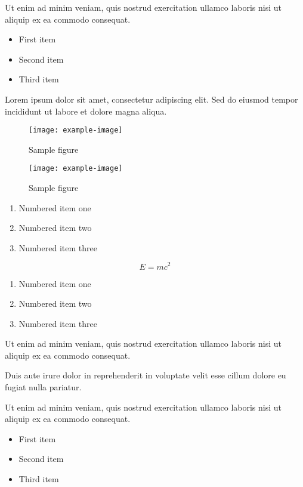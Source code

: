 \documentclass{article}
\begin{document}
Ut enim ad minim veniam, quis nostrud exercitation ullamco laboris nisi ut aliquip ex ea commodo consequat.

\begin{itemize}
\item First item
\item Second item
\item Third item
\end{itemize}

Lorem ipsum dolor sit amet, consectetur adipiscing elit. Sed do eiusmod tempor incididunt ut labore et dolore magna aliqua.

\begin{figure}[h]
    \centering
    \texttt{[image: example-image]}
    \caption{Sample figure}
    \label{fig:sample}
\end{figure}

\begin{figure}[h]
    \centering
    \texttt{[image: example-image]}
    \caption{Sample figure}
    \label{fig:sample}
\end{figure}

\begin{enumerate}
\item Numbered item one
\item Numbered item two
\item Numbered item three
\end{enumerate}

\begin{equation}
    E = mc^2
\end{equation}


\begin{enumerate}
\item Numbered item one
\item Numbered item two
\item Numbered item three
\end{enumerate}

Ut enim ad minim veniam, quis nostrud exercitation ullamco laboris nisi ut aliquip ex ea commodo consequat.

Duis aute irure dolor in reprehenderit in voluptate velit esse cillum dolore eu fugiat nulla pariatur.


Ut enim ad minim veniam, quis nostrud exercitation ullamco laboris nisi ut aliquip ex ea commodo consequat.

\begin{itemize}
\item First item
\item Second item
\item Third item
\end{itemize}
\end{document}

